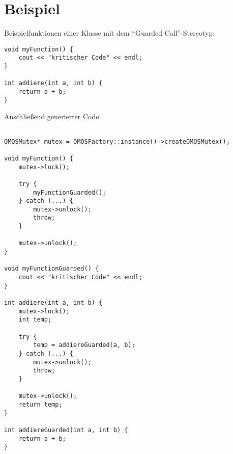\section{Beispiel}

Beispielfunktionen einer Klasse mit dem \enquote{Guarded Call}-Stereotyp:

\begin{lstlisting}
void myFunction() {
	cout << "kritischer Code" << endl;
}

int addiere(int a, int b) {
	return a + b;
}
\end{lstlisting}

Anschließend generierter Code:

 \begin{lstlisting}

OMOSMutex* mutex = OMOSFactory::instance()->createOMOSMutex();

void myFunction() {
	mutex->lock();

	try {
		myFunctionGuarded();
	} catch (...) {
		mutex->unlock();
		throw;
	}

	mutex->unlock();
}

void myFunctionGuarded() {
	cout << "kritischer Code" << endl;
}

int addiere(int a, int b) {
	mutex->lock();
	int temp;

	try {
		temp = addiereGuarded(a, b);
	} catch (...) {
		mutex->unlock();
		throw;
	}

	mutex->unlock();
	return temp;
}

int addiereGuarded(int a, int b) {
	return a + b;
}

\end{lstlisting}